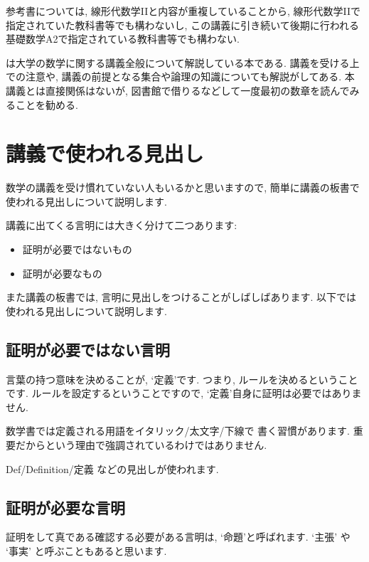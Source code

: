 参考書については,
線形代数学IIと内容が重複していることから,
線形代数学IIで指定されていた教科書等でも構わないし,
この講義に引き続いて後期に行われる
基礎数学A2で指定されている教科書等でも構わない.



\cite{978-4-535-78682-0}は大学の数学に関する講義全般について解説している本である.
講義を受ける上での注意や,
講義の前提となる集合や論理の知識についても解説がしてある.
本講義とは直接関係はないが,
図書館で借りるなどして一度最初の数章を読んでみることを勧める.

\section{講義で使われる見出し}
数学の講義を受け慣れていない人もいるかと思いますので,
簡単に講義の板書で使われる見出しについて説明します.

講義に出てくる言明には大きく分けて二つあります:
\begin{itemize}
 \item 証明が必要ではないもの
 \item 証明が必要なもの
\end{itemize}
また講義の板書では,
言明に見出しをつけることがしばしばあります.
以下では使われる見出しについて説明します.
\subsection{証明が必要ではない言明}
言葉の持つ意味を決めることが,
`定義'です.
つまり, ルールを決めるということです.
ルールを設定するということですので,
`定義'自身に証明は必要ではありません.

数学書では定義される用語をイタリック/太文字/下線で
書く習慣があります.
重要だからという理由で強調されているわけではありません.

Def/Definition/定義 などの見出しが使われます.

\subsection{証明が必要な言明}
証明をして真である確認する必要がある言明は,
`命題'と呼ばれます.
`主張' や `事実' と呼ぶこともあると思います.


